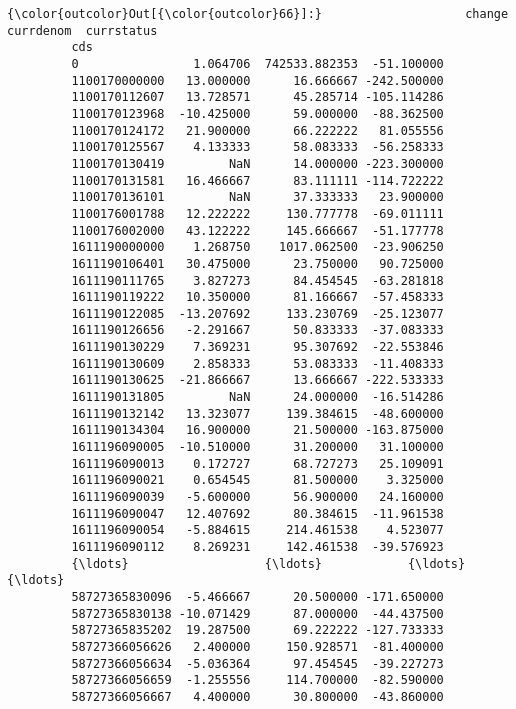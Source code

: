 \documentclass[11pt]{article}
\begin{document}
\begin{Verbatim}[commandchars=\\\{\}]
{\color{outcolor}Out[{\color{outcolor}66}]:}                    change      currdenom  currstatus
         cds                                                 
         0                1.064706  742533.882353  -51.100000
         1100170000000   13.000000      16.666667 -242.500000
         1100170112607   13.728571      45.285714 -105.114286
         1100170123968  -10.425000      59.000000  -88.362500
         1100170124172   21.900000      66.222222   81.055556
         1100170125567    4.133333      58.083333  -56.258333
         1100170130419         NaN      14.000000 -223.300000
         1100170131581   16.466667      83.111111 -114.722222
         1100170136101         NaN      37.333333   23.900000
         1100176001788   12.222222     130.777778  -69.011111
         1100176002000   43.122222     145.666667  -51.177778
         1611190000000    1.268750    1017.062500  -23.906250
         1611190106401   30.475000      23.750000   90.725000
         1611190111765    3.827273      84.454545  -63.281818
         1611190119222   10.350000      81.166667  -57.458333
         1611190122085  -13.207692     133.230769  -25.123077
         1611190126656   -2.291667      50.833333  -37.083333
         1611190130229    7.369231      95.307692  -22.553846
         1611190130609    2.858333      53.083333  -11.408333
         1611190130625  -21.866667      13.666667 -222.533333
         1611190131805         NaN      24.000000  -16.514286
         1611190132142   13.323077     139.384615  -48.600000
         1611190134304   16.900000      21.500000 -163.875000
         1611196090005  -10.510000      31.200000   31.100000
         1611196090013    0.172727      68.727273   25.109091
         1611196090021    0.654545      81.500000    3.325000
         1611196090039   -5.600000      56.900000   24.160000
         1611196090047   12.407692      80.384615  -11.961538
         1611196090054   -5.884615     214.461538    4.523077
         1611196090112    8.269231     142.461538  -39.576923
         {\ldots}                   {\ldots}            {\ldots}         {\ldots}
         58727365830096  -5.466667      20.500000 -171.650000
         58727365830138 -10.071429      87.000000  -44.437500
         58727365835202  19.287500      69.222222 -127.733333
         58727366056626   2.400000     150.928571  -81.400000
         58727366056634  -5.036364      97.454545  -39.227273
         58727366056659  -1.255556     114.700000  -82.590000
         58727366056667   4.400000      30.800000  -43.860000

\end{Verbatim}
\end{document}
